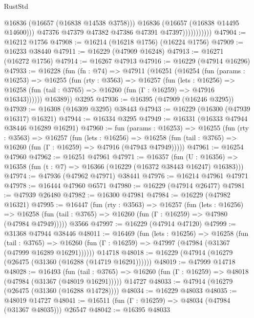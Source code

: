 \begin{lexlean}{RustStd}
\begin{coremodule}
                              @16836
                              (@16657 (@16838 @14538 @3758)))
                            @16836
                            (@16657 (@16838 @14495 @14600)))
                          @47376
                          @47379
                          @47382
                          @47386
                          @47391
                          @47397)))))))))))
@47904 := @16212 @1756
@47908 := @16214 (@16218 @1756) (@16224 @1756)
@47909 := @16233 @38440
@47911 := @16229 (@47909 @16248)
@47913 := @16271 (@16272 @1756)
@47914 := @16267 @47913
@47916 := @16229 (@47914 @16296)
@47933 := @16228
    (fun (fn : @74) =>
    @47911
      (@16251
        (@16254
          (fun (params : @16253) =>
          @16255
            (fun (rty : @3563) =>
            @16257
              (fun (lets : @16256) =>
              @16258 (fun (tail : @3765) => @16260 (fun (Γ : @16259) => @47916 @16343))))))
        @16389))
    @3295
@47936 := @16395 (@47909 (@16246 @3295))
@47939 := @16308 (@16309 @3295) @38443
@47943 := @16229 (@16300 (@47939 @16317) @16321)
@47944 := @16334 @3295
@47949 := @16331 (@16333 @47944 @38446 @16289 @16291)
@47960 := fun (params : @16253) =>
  @16255
    (fun (rty : @3563) =>
    @16257
      (fun (lets : @16256) =>
      @16258 (fun (tail : @3765) => @16260 (fun (Γ : @16259) => @47916 (@47943 @47949)))))
@47961 := @16254 @47960
@47962 := @16251 @47961
@47971 := @16357
    (fun (U : @16356) => @16358 (fun (t : @7) => @16366 (@16229 (@16372 @38443 @16247) @16383)))
@47974 := @47936 (@47962 @47971) @38441
@47976 := @16214 @47961 @47971
@47978 := @16444 @47960 @6571
@47980 := @16229 (@47914 @26477)
@47981 := @47939 @26480
@47982 := @16300 @47981
@47984 := @16229 (@47982 @16321)
@47995 := @16447
    (fun (rty : @3563) =>
    @16257
      (fun (lets : @16256) =>
      @16258 (fun (tail : @3765) => @16260 (fun (Γ : @16259) => @47980 (@47984 @47949)))))
    @3566
@47997 := @16229 (@47914 @47120)
@47999 := @31368 @47944 @38446
@48011 := @16469
    (fun (lets : @16256) =>
    @16258
      (fun (tail : @3765) =>
      @16260 (fun (Γ : @16259) => @47997 (@47984 (@31367 (@47999 @16289 @16291))))))
    @14718
@48018 := @16229 (@47914 (@16279 (@26475 (@31360 (@16288 (@14719 @16291))))))
@48019 := @47999 @14718
@48028 := @16493
    (fun (tail : @3765) => @16260 (fun (Γ : @16259) => @48018 (@47984 (@31367 (@48019 @16291)))))
    @14727
@48033 := @47914 (@16279 (@26475 (@31360 (@16288 @14728))))
@48034 := @16229 @48033
@48035 := @48019 @14727
@48041 := @16511 (fun (Γ : @16259) => @48034 (@47984 (@31367 @48035))) @26547
@48042 := @16395 @48033

\end{coremodule}
\end{lexlean}
